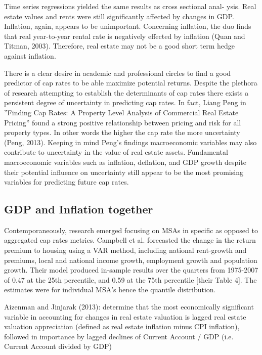 Time series regressions yielded the same results as cross sectional anal- ysis. Real estate values and rents were still significantly affected by changes in GDP. Inflation, again, appears to be unimportant.  Concerning inflation, the duo finds that real year-to-year rental rate is negatively effected by inflation (Quan and Titman, 2003). Therefore, real estate may not be a good short term hedge against inflation.

There is a clear desire in academic and professional circles to find a good predictor of cap rates to be able maximize potential returns. Despite the plethora of research attempting to establish the determinants of cap rates there exists a persistent degree of uncertainty in predicting cap rates. In fact, Liang Peng in ”Finding Cap Rates: A Property Level Analysis of Commercial Real Estate Pricing” found a strong positive relationship between pricing and risk for all property types. In other words the higher the cap rate the more uncertainty (Peng, 2013). Keeping in mind Peng’s findings macroeconomic variables may also contribute to uncertainty in the value of real estate assets. Fundamental macroeconomic variables such as inflation, deflation, and GDP growth despite their potential influence on uncertainty still appear to be the most promising variables for predicting future cap rates.

\subsection{GDP and Inflation together}


Contemporaneously, research emerged focusing on MSAs in specific as opposed to aggregated cap rates metrics. Campbell et al. \citep*{campbell2009moves} forecasted the change in the return premium to housing using a VAR method, including national rent-growth and premiums, local and national income growth, employment growth and population growth. Their model produced in-sample results over the quarters from 1975-2007 of 0.47 at the 25th percentile, and 0.59 at the 75th percentile [their Table 4]. The estimates were for individual MSA’s hence the quantile distribution.

Aizenman and Jinjarak (2013): determine that the most economically significant variable in accounting for changes in real estate valuation is lagged real estate valuation appreciation (defined as real estate inflation minus CPI inflation), followed in importance by lagged declines of Current Account / GDP (i.e. Current Account divided by GDP)

